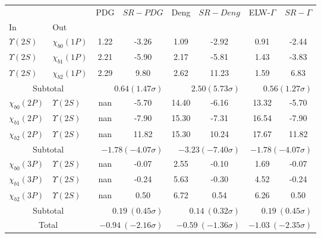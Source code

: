 \begin{tabular}{|l|l|c|c|c|c|c|c|}%
\hline%
&&PDG&$SR-PDG$&Deng&$SR-Deng$&ELW-$\Gamma$&$SR-\Gamma$\\%
In&Out&&&&&&\\%
\hline%
$\Upsilon(2S)$&$\chi_{b0}(1P)$&1.22&-3.26&1.09&-2.92&0.91&-2.44\\%
$\Upsilon(2S)$&$\chi_{b1}(1P)$&2.21&-5.90&2.17&-5.81&1.43&-3.83\\%
$\Upsilon(2S)$&$\chi_{b2}(1P)$&2.29&9.80&2.62&11.23&1.59&6.83\\%
\hline%
\hline%
\multicolumn{2}{|c|}{Subtotal}&\multicolumn{2}{|r|}{$0.64 (1.47\sigma)$}&\multicolumn{2}{|r|}{$2.50 (5.73\sigma)$}&\multicolumn{2}{|r|}{$0.56 (1.27\sigma)$}\\%
\hline%
\hline%
$\chi_{b0}(2P)$&$\Upsilon(2S)$&nan&-5.70&14.40&-6.16&13.32&-5.70\\%
$\chi_{b1}(2P)$&$\Upsilon(2S)$&nan&-7.90&15.30&-7.31&16.54&-7.90\\%
$\chi_{b2}(2P)$&$\Upsilon(2S)$&nan&11.82&15.30&10.24&17.67&11.82\\%
\hline%
\hline%
\multicolumn{2}{|c|}{Subtotal}&\multicolumn{2}{|r|}{$-1.78 (-4.07\sigma)$}&\multicolumn{2}{|r|}{$-3.23 (-7.40\sigma)$}&\multicolumn{2}{|r|}{$-1.78 (-4.07\sigma)$}\\%
\hline%
\hline%
$\chi_{b0}(3P)$&$\Upsilon(2S)$&nan&-0.07&2.55&-0.10&1.69&-0.07\\%
$\chi_{b1}(3P)$&$\Upsilon(2S)$&nan&-0.24&5.63&-0.30&4.52&-0.24\\%
$\chi_{b2}(3P)$&$\Upsilon(2S)$&nan&0.50&6.72&0.54&6.26&0.50\\%
\hline%
\hline%
\multicolumn{2}{|c|}{Subtotal}&\multicolumn{2}{|r|}{$0.19~(0.45\sigma)$}&\multicolumn{2}{|r|}{$0.14~(0.32\sigma)$}&\multicolumn{2}{|r|}{$0.19~(0.45\sigma)$}\\%
\hline%
\hline%
\multicolumn{2}{|c|}{Total}&\multicolumn{2}{|r|}{$-0.94~(-2.16\sigma)$}&\multicolumn{2}{|r|}{$-0.59~(-1.36\sigma)$}&\multicolumn{2}{|r|}{$-1.03~(-2.35\sigma)$}\\%
\hline%
\end{tabular}
